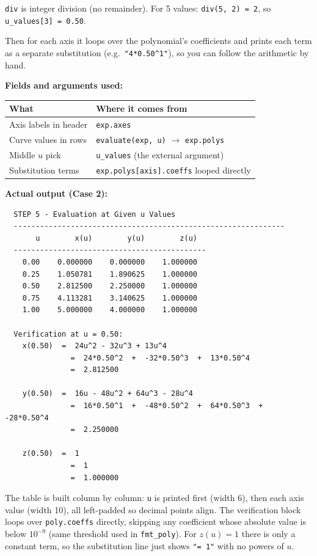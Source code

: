 \documentclass[12pt, a4paper]{article}
\newcommand{\cd}[1]{\texttt{#1}}
\begin{document}
\cd{div} is integer division (no remainder).
For 5 values: \cd{div(5, 2) = 2}, so \cd{u\_values[3] = 0.50}.

Then for each axis it loops over the polynomial's coefficients
and prints each term as a separate substitution
(e.g.\ \cd{"4*0.50\^{}1"}), so you can follow the arithmetic by hand.

\begin{examplebox}
\textbf{Fields and arguments used:}

\medskip
\begin{tabular}{ll}
\toprule
What & Where it comes from \\
\midrule
Axis labels in header & \cd{exp.axes} \\
Curve values in rows  & \cd{evaluate(exp, u)} $\to$ \cd{exp.polys} \\
Middle $u$ pick       & \cd{u\_values} (the external argument) \\
Substitution terms    & \cd{exp.polys[axis].coeffs} looped directly \\
\bottomrule
\end{tabular}
\end{examplebox}

\textbf{Actual output (Case 2):}
\begin{verbatim}
  STEP 5 - Evaluation at Given u Values
  --------------------------------------------------------------
       u        x(u)        y(u)        z(u)
  --------------------------------------------
    0.00    0.000000    0.000000    1.000000
    0.25    1.050781    1.890625    1.000000
    0.50    2.812500    2.250000    1.000000
    0.75    4.113281    3.140625    1.000000
    1.00    5.000000    4.000000    1.000000

  Verification at u = 0.50:
    x(0.50)  =  24u^2 - 32u^3 + 13u^4
               =  24*0.50^2  +  -32*0.50^3  +  13*0.50^4
               =  2.812500

    y(0.50)  =  16u - 48u^2 + 64u^3 - 28u^4
               =  16*0.50^1  +  -48*0.50^2  +  64*0.50^3  +  -28*0.50^4
               =  2.250000

    z(0.50)  =  1
               =  1
               =  1.000000
\end{verbatim}

The table is built column by column: \cd{u} is printed first
(width 6), then each axis value (width 10), all left-padded
so decimal points align.
The verification block loops over \cd{poly.coeffs} directly,
skipping any coefficient whose absolute value is below $10^{-9}$
(same threshold used in \cd{fmt\_poly}).
For $z(u) = 1$ there is only a constant term, so the
substitution line just shows \cd{"= 1"} with no powers of $u$.
\end{document}
